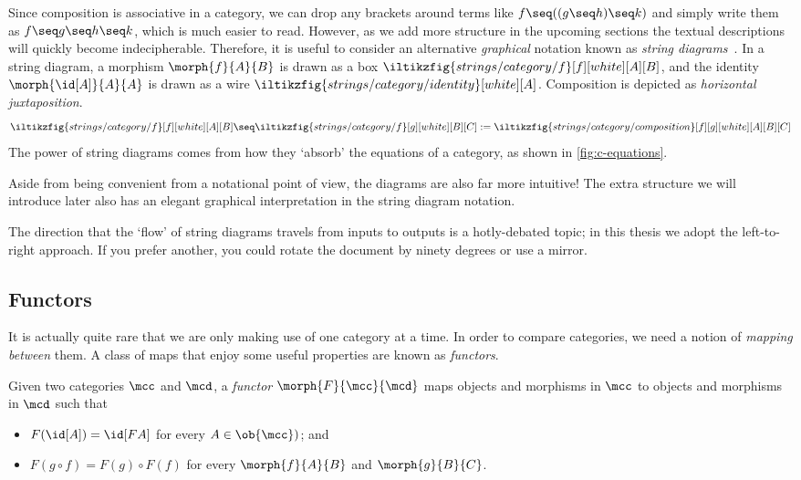 Since composition is associative in a category, we can drop any brackets around
terms like \(
    f \seq ((g \seq h) \seq k)
\) and simply write them as \(
    f \seq g \seq h \seq k
\), which is much easier to read.
However, as we add more structure in the upcoming sections the textual
descriptions will quickly become indecipherable.
Therefore, it is useful to consider an alternative \emph{graphical} notation
known as \emph{string diagrams}~\cite{joyal1991geometry}.
In a string diagram, a morphism \(\morph{f}{A}{B}\) is drawn as a box \(
    \iltikzfig{strings/category/f}[f][white][A][B]
\), and the identity \(\morph{\id[A]}{A}{A}\) is drawn as a wire \(
    \iltikzfig{strings/category/identity}[white][A]
\).
Composition is depicted as \emph{horizontal juxtaposition}. \[
    \iltikzfig{strings/category/f}[f][white][A][B]
    \seq
    \iltikzfig{strings/category/f}[g][white][B][C] :=
    \iltikzfig{strings/category/composition}[f][g][white][A][B][C]
\]
The power of string diagrams comes from how they `absorb' the equations of a
category, as shown in \cref{fig:c-equations}.



Aside from being convenient from a notational point of view, the diagrams are
also far more intuitive!
The extra structure we will introduce later also has an elegant graphical
interpretation in the string diagram notation.

\begin{remark}
    The direction that the `flow' of string diagrams travels from inputs to
    outputs is a hotly-debated topic; in this thesis we adopt the left-to-right
    approach.
    If you prefer another, you could rotate the document by ninety degrees or
    use a mirror.
\end{remark}

\subsection{Functors}

It is actually quite rare that we are only making use of one category at a time.
In order to compare categories, we need a notion of \emph{mapping between} them.
A class of maps that enjoy some useful properties are known as \emph{functors}.

\begin{definition}[Functor]
    Given two categories \(\mcc\) and \(\mcd\), a \emph{functor} \(
        \morph{F}{\mcc}{\mcd}
    \) maps objects and morphisms in \(\mcc\) to objects and morphisms in
    \(\mcd\) such that
    \begin{itemize}
        \item \(F(\id[A]) = \id[FA]\) for every \(A \in \ob{\mcc})\); and
        \item \(F(g \circ f) = F(g) \circ F(f)\) for every \(\morph{f}{A}{B}\)
        and \(\morph{g}{B}{C}\).
    \end{itemize}
\end{definition}

